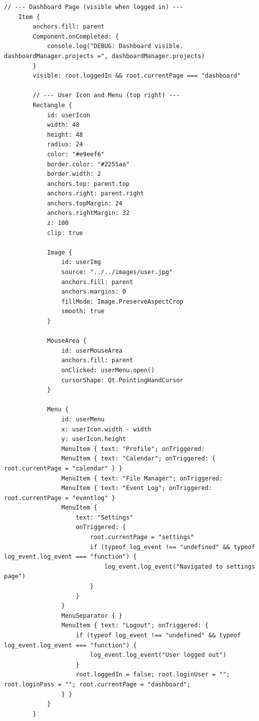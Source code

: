 \documentclass{report}
\begin{document}
\begin{lstlisting}[style=qmlstyle]
    // --- Dashboard Page (visible when logged in) ---
    Item {
        anchors.fill: parent
        Component.onCompleted: {
            console.log("DEBUG: Dashboard visible. dashboardManager.projects =", dashboardManager.projects)
        }
        visible: root.loggedIn && root.currentPage === "dashboard"

        // --- User Icon and Menu (top right) ---
        Rectangle {
            id: userIcon
            width: 48
            height: 48
            radius: 24
            color: "#e9eef6"
            border.color: "#2255aa"
            border.width: 2
            anchors.top: parent.top
            anchors.right: parent.right
            anchors.topMargin: 24
            anchors.rightMargin: 32
            z: 100
            clip: true

            Image {
                id: userImg
                source: "../../images/user.jpg"
                anchors.fill: parent
                anchors.margins: 0
                fillMode: Image.PreserveAspectCrop
                smooth: true
            }

            MouseArea {
                id: userMouseArea
                anchors.fill: parent
                onClicked: userMenu.open()
                cursorShape: Qt.PointingHandCursor
            }

            Menu {
                id: userMenu
                x: userIcon.width - width
                y: userIcon.height
                MenuItem { text: "Profile"; onTriggered: 
                MenuItem { text: "Calendar"; onTriggered: { root.currentPage = "calendar" } }
                MenuItem { text: "File Manager"; onTriggered:
                MenuItem { text: "Event Log"; onTriggered: root.currentPage = "eventlog" }
                MenuItem {
                    text: "Settings"
                    onTriggered: {
                        root.currentPage = "settings"
                        if (typeof log_event !== "undefined" && typeof log_event.log_event === "function") {
                            log_event.log_event("Navigated to settings page")
                        }
                    }
                }
                MenuSeparator { }
                MenuItem { text: "Logout"; onTriggered: {
                    if (typeof log_event !== "undefined" && typeof log_event.log_event === "function") {
                        log_event.log_event("User logged out")
                    }
                    root.loggedIn = false; root.loginUser = ""; root.loginPass = ""; root.currentPage = "dashboard";
                } }
            }
        }


\end{lstlisting}
\end{document}
